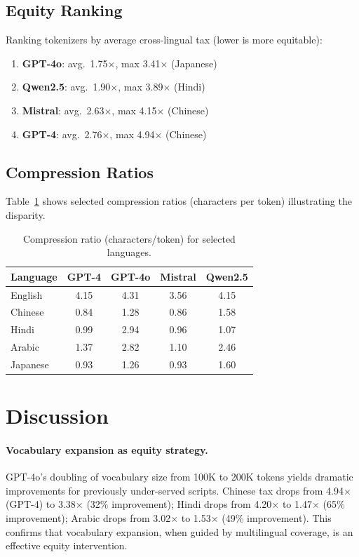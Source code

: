 \documentclass[11pt]{article}
\begin{document}
\subsection{Equity Ranking}

Ranking tokenizers by average cross-lingual tax (lower is more equitable):
\begin{enumerate}
  \item \textbf{GPT-4o}: avg.\ 1.75$\times$, max 3.41$\times$ (Japanese)
  \item \textbf{Qwen2.5}: avg.\ 1.90$\times$, max 3.89$\times$ (Hindi)
  \item \textbf{Mistral}: avg.\ 2.63$\times$, max 4.15$\times$ (Chinese)
  \item \textbf{GPT-4}: avg.\ 2.76$\times$, max 4.94$\times$ (Chinese)
\end{enumerate}

\subsection{Compression Ratios}

Table~\ref{tab:compression} shows selected compression ratios (characters per token) illustrating the disparity.

\begin{table}[h]
\centering
\small
\caption{Compression ratio (characters/token) for selected languages.}
\label{tab:compression}
\begin{tabular}{lcccc}
\toprule
\textbf{Language} & \textbf{GPT-4} & \textbf{GPT-4o} & \textbf{Mistral} & \textbf{Qwen2.5} \\
\midrule
English  & 4.15 & 4.31 & 3.56 & 4.15 \\
Chinese  & 0.84 & 1.28 & 0.86 & 1.58 \\
Hindi    & 0.99 & 2.94 & 0.96 & 1.07 \\
Arabic   & 1.37 & 2.82 & 1.10 & 2.46 \\
Japanese & 0.93 & 1.26 & 0.93 & 1.60 \\
\bottomrule
\end{tabular}
\end{table}

\section{Discussion}

\paragraph{Vocabulary expansion as equity strategy.}
GPT-4o's doubling of vocabulary size from 100K to 200K tokens yields dramatic improvements for previously under-served scripts.
Chinese tax drops from 4.94$\times$ (GPT-4) to 3.38$\times$ (32\% improvement); Hindi drops from 4.20$\times$ to 1.47$\times$ (65\% improvement); Arabic drops from 3.02$\times$ to 1.53$\times$ (49\% improvement).
This confirms that vocabulary expansion, when guided by multilingual coverage, is an effective equity intervention.
\end{document}
